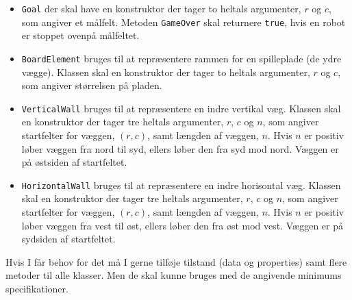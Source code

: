 \begin{itemize}
\item \lstinline{Goal} der skal have en konstruktor der tager to
  heltals argumenter, $r$ og $c$, som angiver et målfelt. Metoden
  \lstinline{GameOver} skal returnere \lstinline{true}, hvis en robot
  er stoppet ovenpå målfeltet.
\item \lstinline{BoardElement} bruges til at repræsentere rammen for
  en spilleplade (de ydre vægge). Klassen skal en konstruktor der tager to
  heltals argumenter, $r$ og $c$, som angiver størrelsen på pladen.
\item \lstinline{VerticalWall} bruges til at repræsentere en indre
  vertikal væg. Klassen skal en konstruktor der tager tre
  heltals argumenter, $r$, $c$ og $n$, som angiver startfelter for
  væggen, $(r,c)$, samt længden af væggen, $n$. Hvis $n$ er positiv
  løber væggen fra nord til syd, ellers løber den fra syd mod
  nord. Væggen er på østsiden af startfeltet.
\item \lstinline{HorizontalWall} bruges til at repræsentere en indre
  horisontal væg. Klassen skal en konstruktor der tager tre
  heltals argumenter, $r$, $c$ og $n$, som angiver startfelter for
  væggen, $(r,c)$, samt længden af væggen, $n$. Hvis $n$ er positiv
  løber væggen fra vest til øst, ellers løber den fra øst mod
  vest. Væggen er på sydsiden af startfeltet.
\end{itemize}

Hvis I får behov for det må I gerne tilføje tilstand (data og
properties) samt flere metoder til alle klasser. Men de skal kunne
bruges med de angivende minimums specifikationer.




